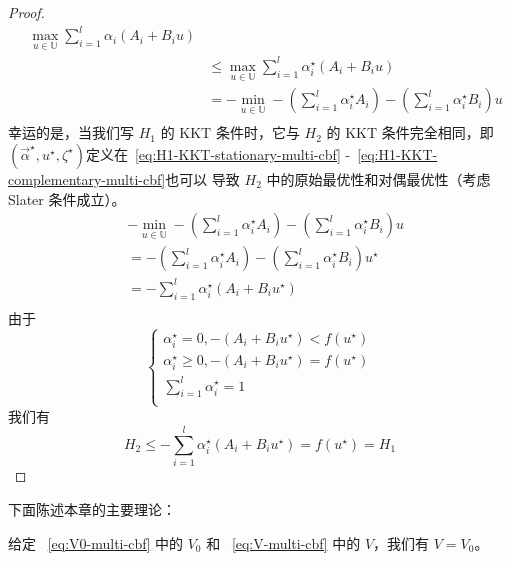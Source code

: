 \begin{proof}
\begin{equation}
\begin{aligned}
{\begin{array}{c}
\end{array}}\max_{u\in \mathbb{U}}\sum_{i=1}^l{\alpha _i\left( A_i+B_iu \right)}\\
	&\le \max_{u\in \mathbb{U}}\sum_{i=1}^l{\alpha _{i}^{\star}\left( A_i+B_iu \right)}\\
	&=-\min_{u\in \mathbb{U}}-\left( \sum_{i=1}^l{\alpha _{i}^{\star}A_i} \right) -\left( \sum_{i=1}^l{\alpha _{i}^{\star}B_i} \right) u\\
\end{aligned}
\end{equation}
幸运的是，当我们写 $H_1$ 的 KKT 条件时，它与 $H_2$ 的 KKT 条件完全相同，即 $\left( \overrightarrow{\alpha }^{\star},u^{\star },\zeta ^{\star} \right) $定义在~\eqref{eq:H1-KKT-stationary-multi-cbf} -~\eqref{eq:H1-KKT-complementary-multi-cbf}也可以 导致 $H_2$ 中的原始最优性和对偶最优性（考虑 Slater 条件成立）。
\begin{equation}
\begin{aligned}
	&-\min_{u\in \mathbb{U}} -\left( \sum_{i=1}^l{\alpha _{i}^{\star}A_i} \right) -\left( \sum_{i=1}^l{\alpha _{i}^{\star}B_i} \right) u\\
    &=-\left( \sum_{i=1}^l{\alpha _{i}^{\star}A_i} \right) -\left( \sum_{i=1}^l{\alpha _{i}^{\star}B_i} \right) u^{\star}\\
	&=-\sum_{i=1}^l{\alpha _{i}^{\star}\left( A_i+B_iu^{\star} \right)}\\
\end{aligned}
\end{equation}
由于
\begin{equation}
\begin{cases}
	\alpha _{i}^{\star}=0,-\left( A_i+B_iu^{\star} \right) <f\left( u^{\star} \right)\\
	\alpha _{i}^{\star}\ge 0,-\left( A_i+B_iu^{\star} \right) =f\left( u^{\star} \right)\\
	\sum_{i=1}^l{\alpha _{i}^{\star}}=1\\
\end{cases}
\end{equation}
我们有
\begin{equation}
H_2\le -\sum_{i=1}^l{\alpha _{i}^{\star}\left( A_i+B_iu^{\star} \right)}=f\left( u^{\star} \right) =H_1
\end{equation}
\end{proof}

下面陈述本章的主要理论：
\begin{theorem} \label{thm:V0-V-multi-cbf}
    给定 ~\eqref{eq:V0-multi-cbf} 中的 $V_0$ 和 ~\eqref{eq:V-multi-cbf} 中的 $V$，我们有 $V=V_0$。
\end{theorem}

